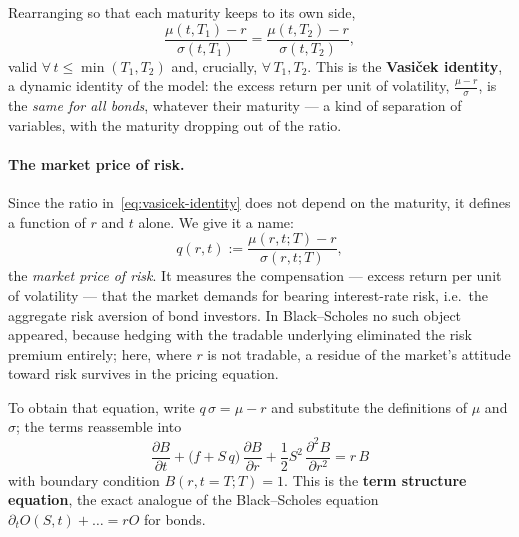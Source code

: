 Rearranging so that each maturity keeps to its own side,
\begin{equation}\label{eq:vasicek-identity}
\frac{\mu(t,T_1) - r}{\sigma(t,T_1)} = \frac{\mu(t,T_2) - r}{\sigma(t,T_2)},
\end{equation}
valid $\forall\, t \le \min(T_1, T_2)$ and, crucially, $\forall\, T_1, T_2$.
This is the \textbf{Vasi\v{c}ek identity}, a dynamic identity of the model: the excess return per unit of volatility, $\frac{\mu - r}{\sigma}$, is the \emph{same for all bonds}, whatever their maturity --- a kind of separation of variables, with the maturity dropping out of the ratio.

\paragraph*{The market price of risk.}

Since the ratio in~\eqref{eq:vasicek-identity} does not depend on the maturity, it defines a function of $r$ and $t$ alone.
We give it a name:
\begin{equation}\label{eq:market-price-risk}
q(r,t) := \frac{\mu(r,t;T) - r}{\sigma(r,t;T)},
\end{equation}
the \emph{market price of risk}.
It measures the compensation --- excess return per unit of volatility --- that the market demands for bearing interest-rate risk, i.e.\ the aggregate risk aversion of bond investors.
In Black--Scholes no such object appeared, because hedging with the tradable underlying eliminated the risk premium entirely; here, where $r$ is not tradable, a residue of the market's attitude toward risk survives in the pricing equation.

To obtain that equation, write $q\,\sigma = \mu - r$ and substitute the definitions of $\mu$ and $\sigma$; the terms reassemble into
\begin{equation}\label{eq:term-structure}
\boxed{\frac{\partial B}{\partial t} + \bigl(f + S\,q\bigr)\,\frac{\partial B}{\partial r} + \frac{1}{2}S^2\,\frac{\partial^2 B}{\partial r^2} = r\, B}
\end{equation}
with boundary condition $B(r, t=T; T) = 1$.
This is the \textbf{term structure equation}, the exact analogue of the Black--Scholes equation $\partial_t O(S,t) + \ldots = rO$ for bonds.

